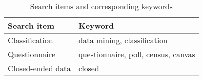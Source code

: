 

\begin{table}[h!]
  \begin{center}
    \caption{Search items and corresponding keywords}
    \label{tab:table1}
    \begin{tabular}{l|l} %
      \textbf{Search item} & \textbf{Keyword}                    \\
      \hline
      Classification       & data mining, classification         \\
      \hline
      Questionnaire        & questionnaire, poll, census, canvas \\
      \hline
      Closed-ended data    & closed                              \\
    \end{tabular}
  \end{center}
\end{table}
